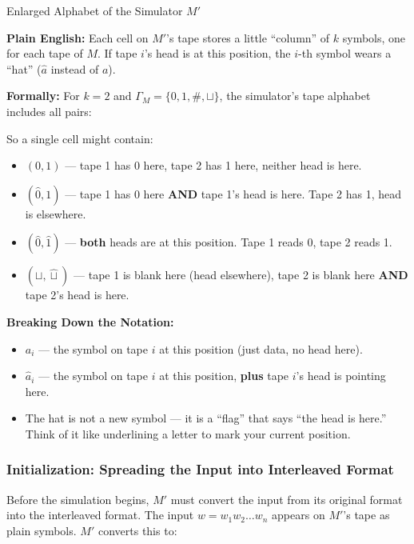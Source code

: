 \begin{definitionbox}{{Enlarged Alphabet of the Simulator $M'$}}

\textbf{Plain English:} Each cell on $M'$'s tape stores a little ``column'' of $k$ symbols, one for each tape of $M$. If tape $i$'s head is at this position, the $i$-th symbol wears a ``hat'' ($\hat{a}$ instead of $a$).

\textbf{Formally:} For $k = 2$ and $\Gamma_M = \{0, 1, \#, \sqcup\}$, the simulator's tape alphabet includes all pairs:


So a single cell might contain:
\begin{itemize}[nosep]
\item $(0, 1)$ --- tape 1 has 0 here, tape 2 has 1 here, neither head is here.
\item $(\hat{0}, 1)$ --- tape 1 has 0 here \textbf{AND} tape 1's head is here. Tape 2 has 1, head is elsewhere.
\item $(\hat{0}, \hat{1})$ --- \textbf{both} heads are at this position. Tape 1 reads 0, tape 2 reads 1.
\item $(\sqcup, \hat{\sqcup})$ --- tape 1 is blank here (head elsewhere), tape 2 is blank here \textbf{AND} tape 2's head is here.
\end{itemize}

\textbf{Breaking Down the Notation:}
\begin{itemize}[nosep]
\item $a_i$ --- the symbol on tape $i$ at this position (just data, no head here).
\item $\hat{a}_i$ --- the symbol on tape $i$ at this position, \textbf{plus} tape $i$'s head is pointing here.
\item The hat is not a new symbol --- it is a ``flag'' that says ``the head is here.'' Think of it like underlining a letter to mark your current position.
\end{itemize}
\end{definitionbox}

\subsubsection{Initialization: Spreading the Input into Interleaved Format}

Before the simulation begins, $M'$ must convert the input from its original format into the interleaved format. The input $w = w_1 w_2 \ldots w_n$ appears on $M'$'s tape as plain symbols. $M'$ converts this to:

